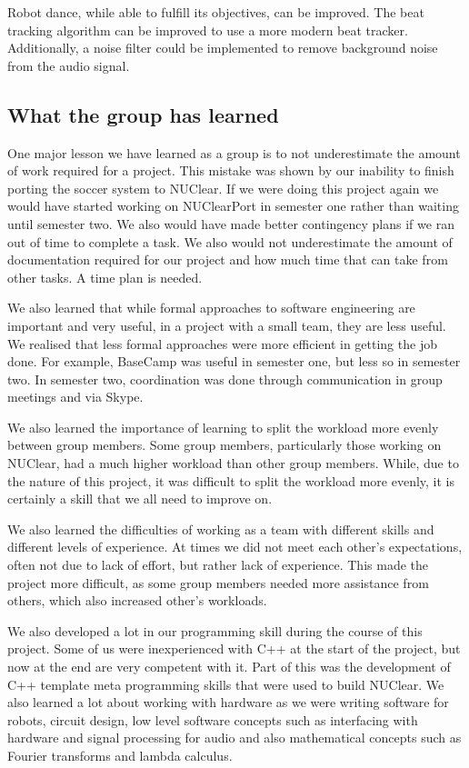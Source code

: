 \documentclass[english,12pt]{scrartcl}
\begin{document}
		Robot dance, while able to fulfill its objectives, can be improved.
		The beat tracking algorithm can be improved to use a more modern beat tracker.
		Additionally, a noise filter could be implemented to remove background noise from the audio signal.

	\subsection{What the group has learned}
		One major lesson we have learned as a group is to not underestimate the amount of work required for a project.
		This mistake was shown by our inability to finish porting the soccer system to NUClear.
		If we were doing this project again we would have started working on NUClearPort in semester one rather than waiting until semester two.
		We also would have made better contingency plans if we ran out of time to complete a task.
		We also would not underestimate the amount of documentation required for our project and how much time that can take from other tasks.
		A time plan is needed.

		We also learned that while formal approaches to software engineering are important and very useful, in a project with a small team, they are less useful.
		We realised that less formal approaches were more efficient in getting the job done.
		For example, BaseCamp was useful in semester one, but less so in semester two.
		In semester two, coordination was done through communication in group meetings and via Skype.

		We also learned the importance of learning to split the workload more evenly between group members.
		Some group members, particularly those working on NUClear, had a much higher workload than other group members.
		While, due to the nature of this project, it was difficult to split the workload more evenly, it is certainly a skill that we all need to improve on.

		We also learned the difficulties of working as a team with different skills and different levels of experience.
		At times we did not meet each other’s expectations, often not due to lack of effort, but rather lack of experience.
		This made the project more difficult, as some group members needed more assistance from others, which also increased other’s workloads.

		We also developed a lot in our programming skill during the course of this project.
		Some of us were inexperienced with C++ at the start of the project, but now at the end are very competent with it.
		Part of this was the development of C++ template meta programming skills that were used to build NUClear.
		We also learned a lot about working with hardware as we were writing software for robots, circuit design, low level software concepts such as interfacing with hardware and signal processing for audio and also mathematical concepts such as Fourier transforms and lambda calculus.
\end{document}

